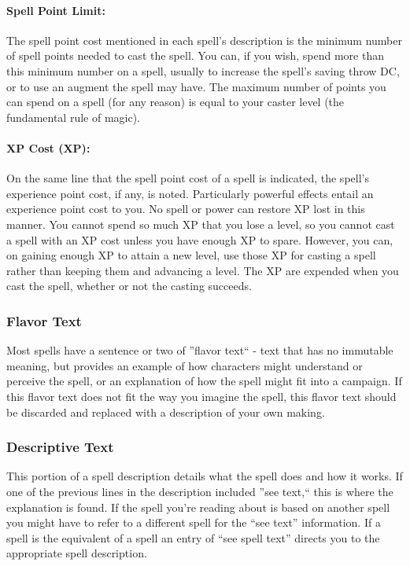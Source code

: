 \paragraph{Spell Point Limit:} 
The spell point cost mentioned in each spell's description is the minimum number of spell points needed to cast the spell. 
You can, if you wish, spend more than this minimum number on a spell, usually to increase the spell's saving throw
DC, or to use an augment the spell may have.
The maximum number of points you can spend on a spell (for any reason) is equal to your caster level (the fundamental rule of magic).

\paragraph{XP Cost (XP):} On the same line that the spell point cost of a spell is indicated, the spell's experience point cost, if any, is noted. Particularly powerful effects entail an experience point cost to you. No spell or power can restore XP lost in this manner. You cannot spend so much XP that you lose a level, so you cannot cast a spell with an XP cost unless you have enough XP to spare. However, you can, on gaining enough XP to attain a new level, use those XP for casting a spell rather than keeping them and advancing a level. The XP are expended when you cast the spell, whether or not the casting succeeds.

\subsubsection{Flavor Text}
Most spells have a sentence or two of ''flavor text`` - text that has no immutable meaning, but provides an example of how characters might understand or perceive the spell, or an explanation of how the spell might fit into a campaign.
If this flavor text does not fit the way you imagine the spell, this flavor text should be discarded and replaced with a description of your own making.

\subsubsection{Descriptive Text}
This portion of a spell description details what the spell does and how it works. If one of the previous lines in the description included ''see text,`` this is where the explanation is found. If the spell you're reading about is based on another spell you might have to refer to a different spell for the “see text” information. If a spell is the equivalent of a spell an entry of “see spell text” directs you to the appropriate spell description.

